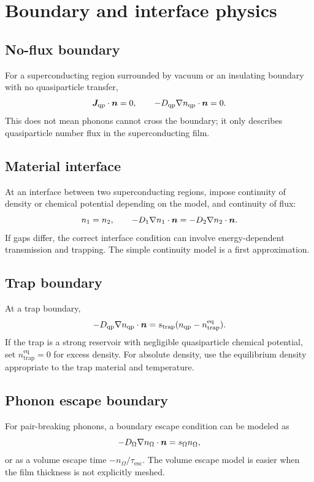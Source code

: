 \documentclass[11pt]{article}
\newcommand{\esc}{\mathrm{esc}}
\newcommand{\trap}{\mathrm{trap}}
\newcommand{\eq}{\mathrm{eq}}
\begin{document}
\section{Boundary and interface physics}

\subsection{No-flux boundary}
For a superconducting region surrounded by vacuum or an insulating boundary with no quasiparticle transfer,
\begin{equation}
\bm{J}_{\mathrm{qp}}\cdot\bm{n}=0,
\qquad
-D_{\mathrm{qp}}\nabla n_{\mathrm{qp}}\cdot\bm{n}=0.
\end{equation}
This does not mean phonons cannot cross the boundary; it only describes quasiparticle number flux in the superconducting film.

\subsection{Material interface}
At an interface between two superconducting regions, impose continuity of density or chemical potential depending on the model, and continuity of flux:
\begin{equation}
 n_1=n_2,
\qquad
-D_1\nabla n_1\cdot\bm{n}=-D_2\nabla n_2\cdot\bm{n}.
\end{equation}
If gaps differ, the correct interface condition can involve energy-dependent transmission and trapping. The simple continuity model is a first approximation.

\subsection{Trap boundary}
At a trap boundary,
\begin{equation}
-D_{\qp}\nabla n_{\qp}\cdot\nvec=s_{\trap}(n_{\qp}-n_{\trap}^{\eq}).
\end{equation}
If the trap is a strong reservoir with negligible quasiparticle chemical potential, set $n_{\trap}^{\eq}=0$ for excess density. For absolute density, use the equilibrium density appropriate to the trap material and temperature.

\subsection{Phonon escape boundary}
For pair-breaking phonons, a boundary escape condition can be modeled as
\begin{equation}
-D_{\Omega}\nabla n_{\Omega}\cdot\bm{n}=s_{\Omega}n_{\Omega},
\end{equation}
or as a volume escape time $-n_{\Omega}/\tau_{\esc}$. The volume escape model is easier when the film thickness is not explicitly meshed.
\end{document}
